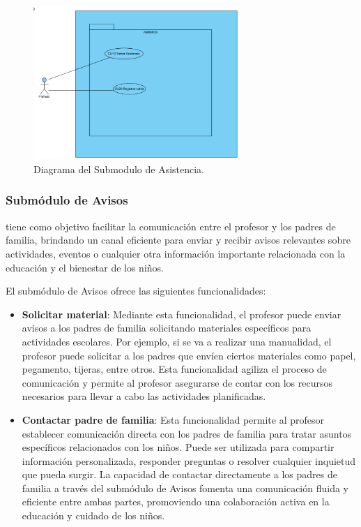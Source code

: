 \begin{figure}[htbp]
\centering
\includegraphics[width=0.7\textwidth]{images/arqui/subSisGestClasesAsis.png}
\caption{Diagrama del Submodulo de Asistencia.}
\label{fig:subsistGestionClasesAsis}
\end{figure}


\subsubsection{Submódulo de Avisos}

tiene como objetivo facilitar la comunicación entre el profesor y los padres de familia, brindando un canal eficiente para enviar y recibir avisos relevantes sobre actividades, eventos o cualquier otra información importante relacionada con la educación y el bienestar de los niños.

El submódulo de Avisos ofrece las siguientes funcionalidades:

\begin{itemize}
\item \textbf{Solicitar material}: Mediante esta funcionalidad, el profesor puede enviar avisos a los padres de familia solicitando materiales específicos para actividades escolares. Por ejemplo, si se va a realizar una manualidad, el profesor puede solicitar a los padres que envíen ciertos materiales como papel, pegamento, tijeras, entre otros. Esta funcionalidad agiliza el proceso de comunicación y permite al profesor asegurarse de contar con los recursos necesarios para llevar a cabo las actividades planificadas.

\item \textbf{Contactar padre de familia}: Esta funcionalidad permite al profesor establecer comunicación directa con los padres de familia para tratar asuntos específicos relacionados con los niños. Puede ser utilizada para compartir información personalizada, responder preguntas o resolver cualquier inquietud que pueda surgir. La capacidad de contactar directamente a los padres de familia a través del submódulo de Avisos fomenta una comunicación fluida y eficiente entre ambas partes, promoviendo una colaboración activa en la educación y cuidado de los niños.

\end{itemize}

